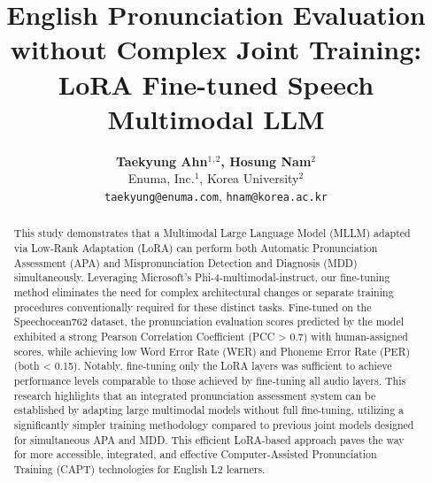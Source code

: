\documentclass[sigconf,nonacm]{acmart}
\begin{document}
\title{English Pronunciation Evaluation without Complex Joint Training: LoRA Fine-tuned Speech Multimodal LLM}




\author{
{\bf Taekyung Ahn${^1}$${^,}$${^2}$, Hosung Nam${^2}$} \\
Enuma, Inc.${^1}$, Korea University${^2}$ \\
\texttt{taekyung@enuma.com}, \texttt{hnam@korea.ac.kr}
}


\renewcommand{\shortauthors}{Ahn et al.}

\begin{abstract}
This study demonstrates that a Multimodal Large Language Model (MLLM) adapted via Low-Rank Adaptation (LoRA) can perform both Automatic Pronunciation Assessment (APA) and Mispronunciation Detection and Diagnosis (MDD) simultaneously. Leveraging Microsoft's Phi-4-multimodal-instruct, our fine-tuning method eliminates the need for complex architectural changes or separate training procedures conventionally required for these distinct tasks. Fine-tuned on the Speechocean762 dataset, the pronunciation evaluation scores predicted by the model exhibited a strong Pearson Correlation Coefficient (PCC > 0.7) with human-assigned scores, while achieving low Word Error Rate (WER) and Phoneme Error Rate (PER) (both < 0.15). Notably, fine-tuning only the LoRA layers was sufficient to achieve performance levels comparable to those achieved by fine-tuning all audio layers. This research highlights that an integrated pronunciation assessment system can be established by adapting large multimodal models without full fine-tuning, utilizing a significantly simpler training methodology compared to previous joint models designed for simultaneous APA and MDD. This efficient LoRA-based approach paves the way for more accessible, integrated, and effective Computer-Assisted Pronunciation Training (CAPT) technologies for English L2 learners.
\end{abstract}
\end{document}
